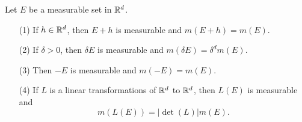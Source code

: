 \documentclass[12pt, a4paper, openany, twoside]{book}
\theoremstyle{definition}
\theoremstyle{remark}
\theoremstyle{plain}
\numberwithin{equation}{section}
\begin{document}
\vspace{5mm}
\begin{tcolorbox}[colback=yellow!10!white,colframe=brown!75!black,title=Proposition 1.3.6]\label{Proposition 1.3.6}
    Let $E$ be a measurable set in ${\mathbb {R}}^d$.
    \begin{enumerate}
        \item [(1)] If $h\in{\mathbb {R}}^d$, then $E+h$ is measurable and $m(E+h)=m(E)$.
        \item [(2)] If $\delta>0$, then $\delta E$ is measurable and $m(\delta E)=\delta^d m(E)$.
        \item [(3)] Then $-E$ is measurable and $m(-E)=m(E)$.
        \item [(4)] If $L$ is a linear transformations of ${\mathbb {R}}^d$ to ${\mathbb {R}}^d$, then $L(E)$ is measurable and 
        \[m(L(E))=|\det{(L)}|m(E).\]
    \end{enumerate}
\end{tcolorbox}
\end{document}
